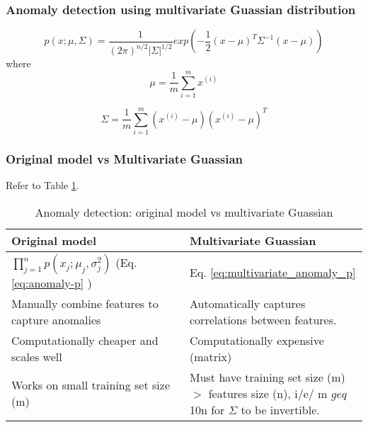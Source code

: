         \subsubsection{Anomaly detection using multivariate Guassian distribution}
        \begin{equation}
            p(x; \mu, \Sigma) = \frac{1}{(2\pi)^{n/2} |\Sigma|^{1/2}} exp (- \frac{1}{2} (x -\mu)^T \Sigma ^{-1} (x-\mu))        
            \label{eq:multivariate_anomaly_p}
        \end{equation}
        where 
            \begin{equation}
                \mu = \frac{1}{m} \sum_{i=1}^{m} x^{(i)}
                \label{eq:anomaly-mu-2}
            \end{equation}

            \begin{equation}
                \Sigma = \frac{1}{m} \sum_{i=1}^{m} (x^{(i)}-\mu) (x^{(i)}-\mu)^T
                \label{eq:}
            \end{equation}



        \subsubsection{Original model vs Multivariate Guassian}
        Refer to Table \ref{tab:anomaly-origin-multivariate}.
            \begin{table}[htpb]
                \centering
                \begin{tabular}{|p{0.5\linewidth}|p{0.5\linewidth}|}
                    \hline
                    Original model & Multivariate Guassian \\
                    \hline
                    $\prod_{j=1}^{n} p(x_j;\mu_j, \sigma^2_j)$ (Eq. \ref{eq:anomaly-p} )& Eq. \ref{eq:multivariate_anomaly_p} \\
                    \hline
                    Manually combine features to capture anomalies & Automatically captures correlations between features. \\
                    \hline
                    Computationally cheaper and scales well & Computationally expensive (matrix) \\
                    \hline 
                    Works on small training set size (m) & Must have training set size (m) $>$ features size (n), i/e/ m $geq$ 10n for $\Sigma$ to be invertible.\\
                    \hline
                    
                \end{tabular}
                \caption{Anomaly detection: original model vs multivariate Guassian}
                \label{tab:anomaly-origin-multivariate}
            \end{table}
